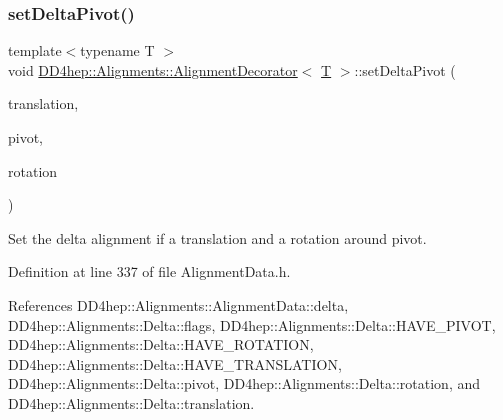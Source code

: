 \hypertarget{class_d_d4hep_1_1_alignments_1_1_alignment_decorator_a5b84d2b352ba02e27815b66a94888999}{}\label{class_d_d4hep_1_1_alignments_1_1_alignment_decorator_a5b84d2b352ba02e27815b66a94888999} 
\subsubsection{\texorpdfstring{set\+Delta\+Pivot()}{setDeltaPivot()}\hspace{0.1cm}{\footnotesize\ttfamily [2/2]}}
{\footnotesize\ttfamily template$<$typename T $>$ \\
void \hyperlink{class_d_d4hep_1_1_alignments_1_1_alignment_decorator}{D\+D4hep\+::\+Alignments\+::\+Alignment\+Decorator}$<$ \hyperlink{class_t}{T} $>$\+::set\+Delta\+Pivot (\begin{DoxyParamCaption}\item[{const Position \&}]{translation,  }\item[{const Translation3D \&}]{pivot,  }\item[{const Rotation\+Z\+YX \&}]{rotation }\end{DoxyParamCaption})\hspace{0.3cm}{\ttfamily [inline]}}



Set the delta alignment if a translation and a rotation around pivot. 



Definition at line 337 of file Alignment\+Data.\+h.



References D\+D4hep\+::\+Alignments\+::\+Alignment\+Data\+::delta, D\+D4hep\+::\+Alignments\+::\+Delta\+::flags, D\+D4hep\+::\+Alignments\+::\+Delta\+::\+H\+A\+V\+E\+\_\+\+P\+I\+V\+OT, D\+D4hep\+::\+Alignments\+::\+Delta\+::\+H\+A\+V\+E\+\_\+\+R\+O\+T\+A\+T\+I\+ON, D\+D4hep\+::\+Alignments\+::\+Delta\+::\+H\+A\+V\+E\+\_\+\+T\+R\+A\+N\+S\+L\+A\+T\+I\+ON, D\+D4hep\+::\+Alignments\+::\+Delta\+::pivot, D\+D4hep\+::\+Alignments\+::\+Delta\+::rotation, and D\+D4hep\+::\+Alignments\+::\+Delta\+::translation.

\hypertarget{class_d_d4hep_1_1_alignments_1_1_alignment_decorator_af4046e3ac4e33de6c0c1f66eedc34ec2}{}\label{class_d_d4hep_1_1_alignments_1_1_alignment_decorator_af4046e3ac4e33de6c0c1f66eedc34ec2} 
